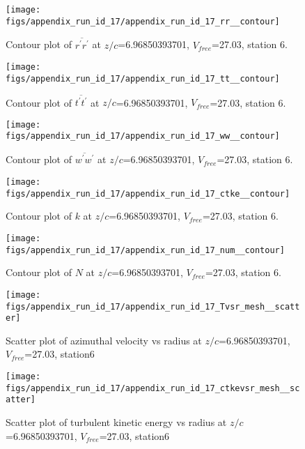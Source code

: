 \begin{figure}[H]
\centering
\texttt{[image: figs/appendix\_run\_id\_17/appendix\_run\_id\_17\_rr\_\_contour]}
\caption{Contour plot of $\overline{r^\prime r^\prime}$ at $z/c$=6.96850393701, $V_{free}$=27.03, station 6.}
\label{fig:appendix_run_id_17_rr__contour}
\end{figure}


\begin{figure}[H]
\centering
\texttt{[image: figs/appendix\_run\_id\_17/appendix\_run\_id\_17\_tt\_\_contour]}
\caption{Contour plot of $\overline{t^\prime t^\prime}$ at $z/c$=6.96850393701, $V_{free}$=27.03, station 6.}
\label{fig:appendix_run_id_17_tt__contour}
\end{figure}


\begin{figure}[H]
\centering
\texttt{[image: figs/appendix\_run\_id\_17/appendix\_run\_id\_17\_ww\_\_contour]}
\caption{Contour plot of $\overline{w^\prime w^\prime}$ at $z/c$=6.96850393701, $V_{free}$=27.03, station 6.}
\label{fig:appendix_run_id_17_ww__contour}
\end{figure}


\begin{figure}[H]
\centering
\texttt{[image: figs/appendix\_run\_id\_17/appendix\_run\_id\_17\_ctke\_\_contour]}
\caption{Contour plot of $k$ at $z/c$=6.96850393701, $V_{free}$=27.03, station 6.}
\label{fig:appendix_run_id_17_ctke__contour}
\end{figure}


\begin{figure}[H]
\centering
\texttt{[image: figs/appendix\_run\_id\_17/appendix\_run\_id\_17\_num\_\_contour]}
\caption{Contour plot of $N$ at $z/c$=6.96850393701, $V_{free}$=27.03, station 6.}
\label{fig:appendix_run_id_17_num__contour}
\end{figure}


\begin{figure}[H]
\centering
\texttt{[image: figs/appendix\_run\_id\_17/appendix\_run\_id\_17\_Tvsr\_mesh\_\_scatter]}
\caption{Scatter plot of azimuthal velocity vs radius at $z/c$=6.96850393701, $V_{free}$=27.03, station6}
\label{fig:appendix_run_id_17_Tvsr_mesh__scatter}
\end{figure}


\begin{figure}[H]
\centering
\texttt{[image: figs/appendix\_run\_id\_17/appendix\_run\_id\_17\_ctkevsr\_mesh\_\_scatter]}
\caption{Scatter plot of turbulent kinetic energy vs radius at $z/c$=6.96850393701, $V_{free}$=27.03, station6}
\label{fig:appendix_run_id_17_ctkevsr_mesh__scatter}
\end{figure}


